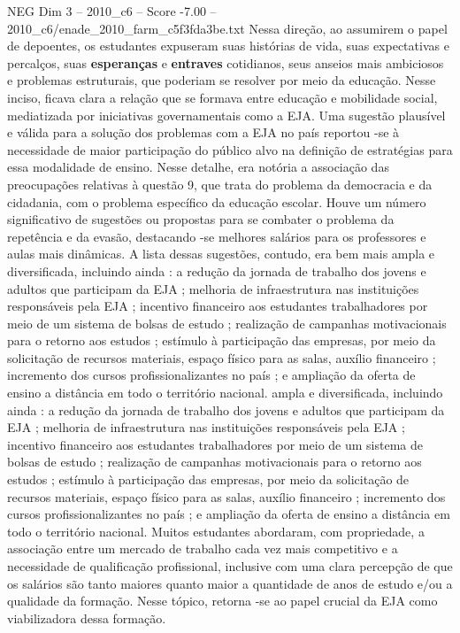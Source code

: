 \begin{textsample}{NEG Dim 3 – 2010\_c6 – Score -7.00 – 2010\_c6/enade\_2010\_farm\_c5f3fda3be.txt}
Nessa direção, ao assumirem o papel de depoentes, os estudantes expuseram suas histórias de vida, suas expectativas e percalços, suas \textbf{esperanças} e \textbf{entraves} cotidianos, seus anseios mais ambiciosos e problemas estruturais, que poderiam se resolver por meio da educação.
Nesse inciso, ficava clara a relação que se formava entre educação e mobilidade social, mediatizada por iniciativas governamentais como a EJA.
Uma sugestão plausível e válida para a solução dos problemas com a EJA no país reportou -se à necessidade de maior participação do público alvo na definição de estratégias para essa modalidade de ensino.
Nesse detalhe, era notória a associação das preocupações relativas à questão 9, que trata do problema da democracia e da cidadania, com o problema específico da educação escolar.
Houve um número significativo de sugestões ou propostas para se combater o problema da repetência e da evasão, destacando -se melhores salários para os professores e aulas mais dinâmicas.
A lista dessas sugestões, contudo, era bem mais ampla e diversificada, incluindo ainda : a redução da jornada de trabalho dos jovens e adultos que participam da EJA ; melhoria de infraestrutura nas instituições responsáveis pela EJA ; incentivo financeiro aos estudantes trabalhadores por meio de um sistema de bolsas de estudo ; realização de campanhas motivacionais para o retorno aos estudos ; estímulo à participação das empresas, por meio da solicitação de recursos materiais, espaço físico para as salas, auxílio financeiro ; incremento dos cursos profissionalizantes no país ; e ampliação da oferta de ensino a distância em todo o território nacional. ampla e diversificada, incluindo ainda : a redução da jornada de trabalho dos jovens e adultos que participam da EJA ; melhoria de infraestrutura nas instituições responsáveis pela EJA ; incentivo financeiro aos estudantes trabalhadores por meio de um sistema de bolsas de estudo ; realização de campanhas motivacionais para o retorno aos estudos ; estímulo à participação das empresas, por meio da solicitação de recursos materiais, espaço físico para as salas, auxílio financeiro ; incremento dos cursos profissionalizantes no país ; e ampliação da oferta de ensino a distância em todo o território nacional.
Muitos estudantes abordaram, com propriedade, a associação entre um mercado de trabalho cada vez mais competitivo e a necessidade de qualificação profissional, inclusive com uma clara percepção de que os salários são tanto maiores quanto maior a quantidade de anos de estudo e/ou a qualidade da formação.
Nesse tópico, retorna -se ao papel crucial da EJA como viabilizadora dessa formação.

\end{textsample}
